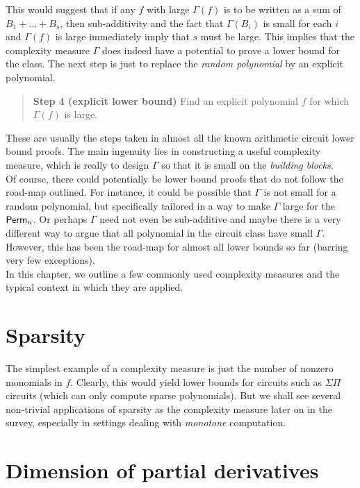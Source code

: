 This would suggest that if any $f$ with large $\Gamma(f)$ is to be written as a sum of $B_1 + \dots + B_s$, then sub-additivity and the fact that $\Gamma(B_i)$ is small for each $i$ and $\Gamma(f)$ is large immediately imply that $s$ must be large. 
This implies that the complexity measure $\Gamma$ does indeed have a potential to prove a lower bound for the class. 
The next step is just to replace the \emph{random polynomial} by an explicit polynomial. 

\begin{quote}
{\bf Step 4 (explicit lower bound)} Find an explicit polynomial $f$ for which $\Gamma(f)$ is large. 
\end{quote} 

These are usually the steps taken in almost all the known arithmetic circuit lower bound proofs. 
The main ingenuity lies in constructing a useful complexity measure, which is really to design $\Gamma$ so that it is small on the \emph{building blocks}. \\

Of course, there could potentially be lower bound proofs that do not follow the road-map outlined. 
For instance, it could be possible that $\Gamma$ is not small for a random polynomial, but specifically tailored in a way to make $\Gamma$ large for the $\operatorname{\mathsf{Perm}}_n$. 
Or perhaps $\Gamma$ need not even be sub-additive and maybe there is a very different way to argue that all polynomial in the circuit class have small $\Gamma$. 
However, this has been the road-map for almost all lower bounds so far (barring very few exceptions). \\

In this chapter, we outline a few commonly used complexity measures and the typical context in which they are applied. 

\section{Sparsity}

The simplest example of a complexity measure is just the number of nonzero monomials in $f$. Clearly, this would yield lower bounds for circuits such as $\Sigma\Pi$ circuits (which can only compute sparse polynomials). But we shall see several non-trivial applications of sparsity as the complexity measure later on in the survey, especially in settings dealing with \emph{monotone} computation. 

\section{Dimension of partial derivatives}

